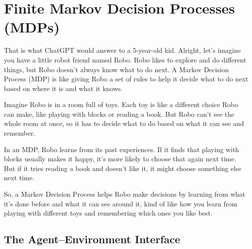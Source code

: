 \documentclass[
  letterpaper,
]{krantz}
\theoremstyle{plain}
\theoremstyle{definition}
\theoremstyle{definition}
\theoremstyle{remark}
\begin{document}

\chapter{Finite Markov Decision Processes
(MDPs)}\label{finite-markov-decision-processes-mdps}

That is what ChatGPT would answer to a 5-year-old kid. Alright, let's
imagine you have a little robot friend named Robo. Robo likes to explore
and do different things, but Robo doesn't always know what to do next. A
Markov Decision Process (MDP) is like giving Robo a set of rules to help
it decide what to do next based on where it is and what it knows.

Imagine Robo is in a room full of toys. Each toy is like a different
choice Robo can make, like playing with blocks or reading a book. But
Robo can't see the whole room at once, so it has to decide what to do
based on what it can see and remember.

In an MDP, Robo learns from its past experiences. If it finds that
playing with blocks usually makes it happy, it's more likely to choose
that again next time. But if it tries reading a book and doesn't like
it, it might choose something else next time.

So, a Markov Decision Process helps Robo make decisions by learning from
what it's done before and what it can see around it, kind of like how
you learn from playing with different toys and remembering which ones
you like best.

\section{The Agent--Environment
Interface}\label{the-agentenvironment-interface}
\end{document}
